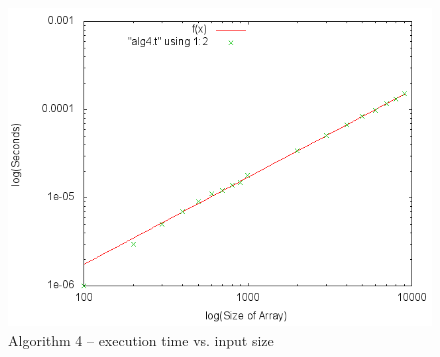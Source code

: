 \documentclass[a4paper,10pt]{article}
\begin{document}
		\begin{figure}[!htb]
			\centering
			\includegraphics[scale=.5]{timingfiles/alg4plotlog.png}
			\caption{Algorithm 4 -- execution time vs. input size}
			\label{fig:alg4}
		\end{figure}
\end{document}
